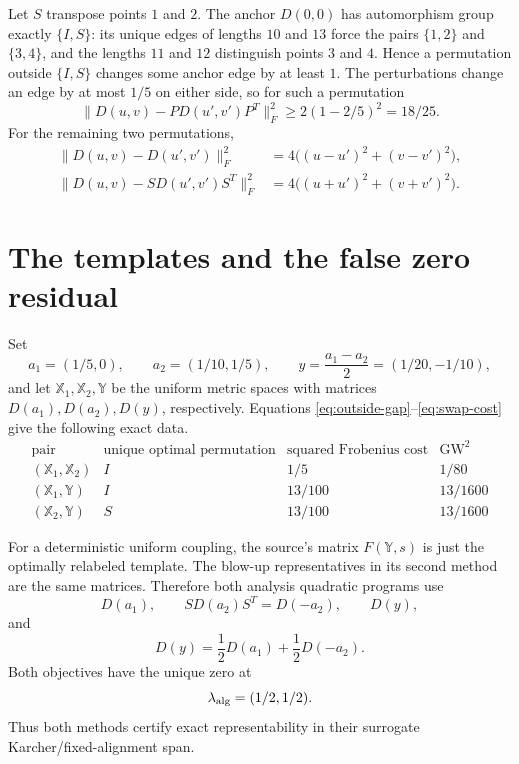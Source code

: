 \documentclass[11pt]{article}
\newcommand{\GW}{\operatorname{GW}}
\begin{document}
Let $S$ transpose points $1$ and $2$. The anchor $D(0,0)$ has automorphism
group exactly $\{I,S\}$: its unique edges of lengths $10$ and $13$ force the
pairs $\{1,2\}$ and $\{3,4\}$, and the lengths $11$ and $12$ distinguish
points $3$ and $4$. Hence a permutation outside $\{I,S\}$ changes some
anchor edge by at least $1$. The perturbations change an edge by at most
$1/5$ on either side, so for such a permutation
\begin{equation}\label{eq:outside-gap}
 \|D(u,v)-P D(u',v')P^T\|_F^2\geq2(1-2/5)^2=18/25.
\end{equation}
For the remaining two permutations,
\begin{align}
 \|D(u,v)-D(u',v')\|_F^2
   &=4\big((u-u')^2+(v-v')^2\big),\label{eq:id-cost}\\
 \|D(u,v)-S D(u',v')S^T\|_F^2
   &=4\big((u+u')^2+(v+v')^2\big).\label{eq:swap-cost}
\end{align}

\section{The templates and the false zero residual}

Set
\[
 a_1=(1/5,0),\qquad a_2=(1/10,1/5),\qquad
 y=\frac{a_1-a_2}{2}=(1/20,-1/10),
\]
and let $\mathbb X_1,\mathbb X_2,\mathbb Y$ be the uniform metric spaces with
matrices $D(a_1),D(a_2),D(y)$, respectively. Equations
\eqref{eq:outside-gap}--\eqref{eq:swap-cost} give the following exact data.
\[
\begin{array}{c|c|c|c}
\text{pair}&\text{unique optimal permutation}&\text{squared Frobenius cost}
 &\GW^2\\ \hline
(\mathbb X_1,\mathbb X_2)&I&1/5&1/80\\
(\mathbb X_1,\mathbb Y)&I&13/100&13/1600\\
(\mathbb X_2,\mathbb Y)&S&13/100&13/1600
\end{array}
\]

For a deterministic uniform coupling, the source's matrix
$F(\mathbb Y,s)$ is just the optimally relabeled template. The blow-up
representatives in its second method are the same matrices. Therefore both
analysis quadratic programs use
\[
 D(a_1),\qquad S D(a_2)S^T=D(-a_2),\qquad D(y),
\]
and
\[
 D(y)=\frac12D(a_1)+\frac12D(-a_2).
\]
Both objectives have the unique zero at
\begin{equation}\label{eq:alg-weight}
 \lambda_{\rm alg}=(1/2,1/2).
\end{equation}
Thus both methods certify exact representability in their surrogate
Karcher/fixed-alignment span.
\end{document}
